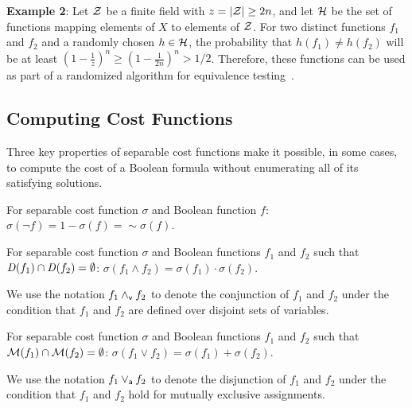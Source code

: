 \documentclass{llncs}
\newcommand{\pand}{\mathbin{\land_{\sf v}}}
\newcommand{\por}{\mathbin{\lor_{\sf a}}}
\newcommand{\tautology}{1}
\newcommand{\nil}{0}
\newcommand{\pite}{\mbox{\it ITE}_{\sf v}}
\newcommand{\oneminus}{{\sim}}
\newcommand{\interpset}[1]{{\cal M}(#1)}
\newcommand{\ring}{{\cal Z}}
\newcommand{\cost}{\sigma}
\newcommand{\hashset}{{\cal H}}
\newcommand{\fhash}{h}
\newcommand{\depend}{{\it D}}
\begin{document}
{\bf Example 2}: Let $\ring$ be a finite field with $z = |\ring| \geq 2n$,
and let $\hashset$ be the set of functions
mapping elements of $X$ to elements of $\ring$.  For
two distinct functions $f_1$ and $f_2$ and a randomly chosen $\fhash
\in \hashset$, the probability that $h(f_1) \not = h(f_2)$ will be at least
$\left(1-\frac{1}{z}\right)^n \geq \left(1-\frac{1}{2n}\right)^n >  1/2$.  Therefore, these functions can be used as part of a
randomized algorithm for equivalence testing~\cite{blum:ipl:1980}.

\subsection{Computing Cost Functions}

Three key properties of separable cost functions make it possible, in
some cases, to compute the cost of a Boolean formula without
enumerating all of its satisfying solutions.


\begin{proposition}[Negation]
\label{prop:negation}
  For separable cost function $\cost$ and Boolean function $f$:
  $\cost(\neg f) = 1 - \cost(f) = \oneminus \cost(f)$.
\end{proposition}

\begin{proposition}
\label{prop:conjunction}
  For separable cost function $\cost$ and Boolean functions $f_1$ and $f_2$ such that $\depend(f_1) \cap \depend(f_2) = \emptyset$:
    $\cost(f_1 \land f_2) = \cost(f_1) \cdot \cost(f_2)$.
\end{proposition}
We use the notation $f_1 \pand f_2$ to denote the conjunction of $f_1$ and
$f_2$ under the condition that $f_1$ and $f_2$ are defined over
disjoint sets of variables.

\begin{proposition}
\label{prop:disjunction}
  For separable cost function $\cost$ and Boolean functions $f_1$ and $f_2$ such that $\interpset{f_1} \cap \interpset{f_2} = \emptyset$:
    $\cost(f_1 \lor f_2) = \cost(f_1) + \cost(f_2)$.
\end{proposition}
We use the notation $f_1 \por f_2$ to denote the disjunction of $f_1$ and $f_2$ under the
condition that $f_1$ and $f_2$ hold for mutually exclusive assignments.




\end{document}
